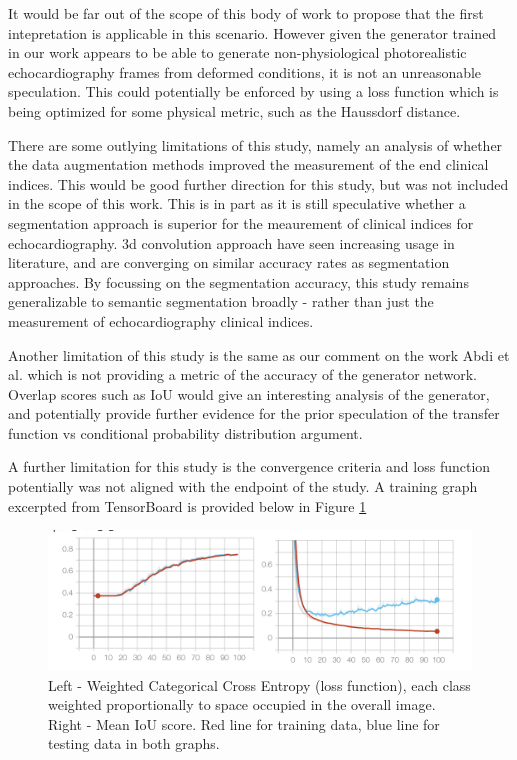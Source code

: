 It would be far out of the scope of this body of work to propose that the first
intepretation is applicable in this scenario. However given the generator
trained in our work appears to be able to generate non-physiological
photorealistic echocardiography frames from deformed conditions, it is not an
unreasonable speculation. This could potentially be enforced by using a loss
function which is being optimized for some physical metric, such as the
Haussdorf distance.\newline

There are some outlying limitations of this study, namely an analysis of whether
the data augmentation methods improved the measurement of the end clinical
indices. This would be good further direction for this study, but was not
included in the scope of this work. This is in part as it is still speculative
whether a segmentation approach is superior for the meaurement of clinical
indices for echocardiography. 3d convolution approach have seen increasing usage
in literature, and are converging on similar accuracy rates as segmentation
approaches. By focussing on the segmentation accuracy, this study remains
generalizable to semantic segmentation broadly - rather than just the
measurement of echocardiography clinical indices. \newline

Another limitation of this study is the same as our comment on the work Abdi et
al. which is not providing a metric of the accuracy of the generator network.
Overlap scores such as IoU would give an interesting analysis of the generator,
and potentially provide further evidence for the prior speculation of the
transfer function vs conditional probability distribution argument. \newline

A further limitation for this study is the convergence criteria and loss function potentially was
not aligned with the endpoint of the study. A training graph excerpted from
TensorBoard is provided below in Figure \ref{fig:tboard}

\begin{figure}[H]
    \centering
    \includegraphics[width=1.0\textwidth]{figures/train.png}
    \caption{Left - Weighted Categorical Cross Entropy (loss function), each class weighted proportionally to space occupied in the overall image. Right - Mean IoU score. Red line for training data, blue line for testing data in both graphs.}
    \label{fig:tboard}
\end{figure}

